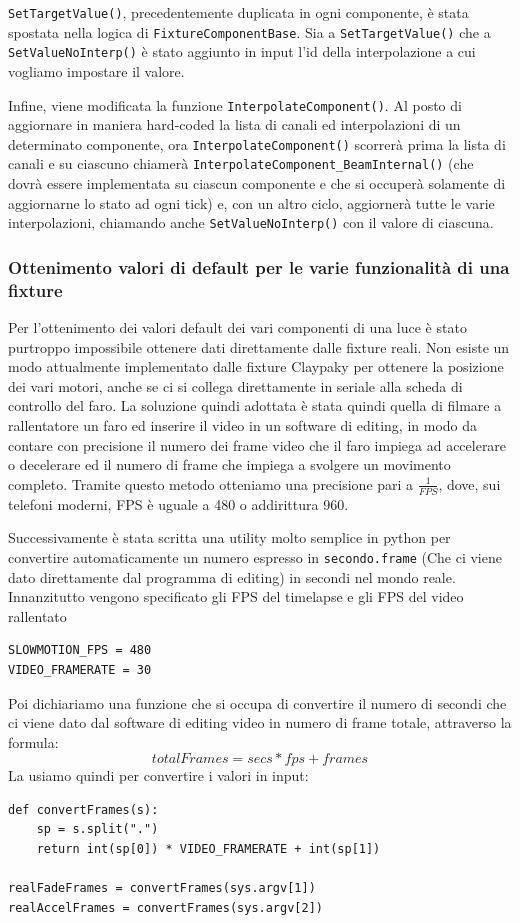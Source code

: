 \documentclass[main.tex]{subfiles}
\begin{document}
\lstinline{SetTargetValue()}, precedentemente duplicata in ogni componente, è stata spostata nella logica di \lstinline{FixtureComponentBase}. Sia a \lstinline{SetTargetValue()} che a \lstinline{SetValueNoInterp()} è stato aggiunto in input l'id della interpolazione a cui vogliamo impostare il valore. 

Infine, viene modificata la funzione \lstinline{InterpolateComponent()}. Al posto di aggiornare in maniera hard-coded la lista di canali ed interpolazioni di un determinato componente, ora \lstinline{InterpolateComponent()} scorrerà prima la lista di canali e su ciascuno chiamerà \lstinline{InterpolateComponent_BeamInternal()} (che dovrà essere implementata su ciascun componente e che si occuperà solamente di aggiornarne lo stato ad ogni tick) e, con un altro ciclo, aggiornerà tutte le varie interpolazioni, chiamando anche \lstinline{SetValueNoInterp()} con il valore di ciascuna.

\subsubsection{Ottenimento valori di default per le varie funzionalità di una fixture}\label{subsec:3_1_defaultValues}
Per l'ottenimento dei valori default dei vari componenti di una luce è stato purtroppo impossibile ottenere dati direttamente dalle fixture reali. Non esiste un modo attualmente implementato dalle fixture Claypaky per ottenere la posizione dei vari motori, anche se ci si collega direttamente in seriale alla scheda di controllo del faro. La soluzione quindi adottata è stata quindi quella di filmare a rallentatore un faro ed inserire il video in un software di editing, in modo da contare con precisione il numero dei frame video che il faro impiega ad accelerare o decelerare ed il numero di frame che impiega a svolgere un movimento completo. Tramite questo metodo otteniamo una precisione pari a $\frac{1}{FPS}$, dove, sui telefoni moderni, FPS è uguale a 480 o addirittura 960.\newline

Successivamente è stata scritta una utility molto semplice in python per convertire automaticamente un numero espresso in \lstinline{secondo.frame} (Che ci viene dato direttamente dal programma di editing) in secondi nel mondo reale.
Innanzitutto vengono specificato gli FPS del timelapse e gli FPS del video rallentato
\lstset{language=python}
\begin{lstlisting}
SLOWMOTION_FPS = 480
VIDEO_FRAMERATE = 30
\end{lstlisting}
Poi dichiariamo una funzione che si occupa di convertire il numero di secondi che ci viene dato dal software di editing video in numero di frame totale, attraverso la formula:
\[totalFrames = secs * fps + frames\]
La usiamo quindi per convertire i valori in input:
\begin{lstlisting}
def convertFrames(s):
    sp = s.split(".")
    return int(sp[0]) * VIDEO_FRAMERATE + int(sp[1])

realFadeFrames = convertFrames(sys.argv[1])
realAccelFrames = convertFrames(sys.argv[2])
\end{lstlisting}
\end{document}
